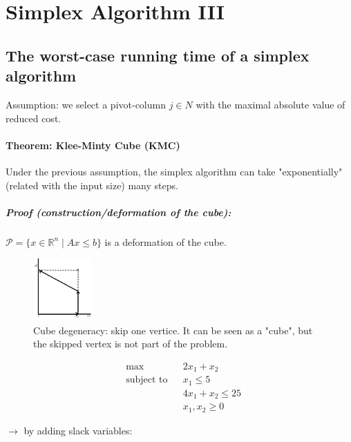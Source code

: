 \documentclass[main]{subfiles}
\begin{document}

\section{Simplex Algorithm III}

\subsection{The worst-case running time of a simplex algorithm}
Assumption: we select a pivot-column $j \in N$ with the maximal absolute value
of reduced cost.

\paragraph{Theorem: Klee-Minty Cube (KMC)} Under the previous assumption, the
simplex algorithm can take "exponentially" (related with the input size) many
steps.

\subparagraph{Proof (construction/deformation of the cube): }

$\mathcal{P} = \{x \in \mathbb{R}^n \mid Ax \leq b \}$ is a deformation of the
cube.

\begin{figure}[!h]
  \label{fig:projection}
  \caption{Cube degeneracy: skip one vertice. It can be seen as a "cube", but
  the skipped vertex is not part of the problem.}
  \centering
    \includegraphics[width=0.2\textwidth]{imgs/kmc.png}
\end{figure}

\begin{equation*}
\begin{aligned}
& \max
& & 2x_1 + x_2 \\
& \text{subject to}
& & x_{1} \leq 5 \\
&&& 4x_1 + x_2 \leq 25\\
&&& x_1, x_2 \geq 0
\end{aligned}
\end{equation*}

$\rightarrow$ by adding slack variables:
\end{document}
